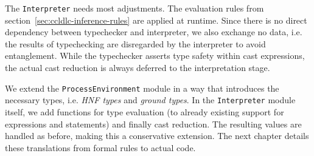 The \texttt{Interpreter} needs most adjustments. The evaluation rules from section~\ref{sec:ccldlc-inference-rules} are applied at runtime. Since there is no direct dependency between typechecker and interpreter, we also exchange no data, i.e. the results of typechecking are disregarded by the interpreter to avoid entanglement. While the typechecker asserts type safety within cast expressions, the actual cast reduction is always deferred to the interpretation stage.

We extend the \texttt{ProcessEnvironment} module in a way that introduces the necessary types, i.e. \emph{HNF types} and \emph{ground types}. In the \texttt{Interpreter} module itself, we add functions for type evaluation (to already existing support for expressions and statements) and finally cast reduction. The resulting values are handled as before, making this a conservative extension. The next chapter details these translations from formal rules to actual code.
